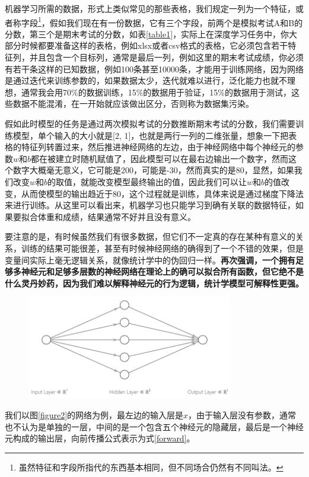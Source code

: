 \documentclass[a5paper, 11pt, openany]{book}
\begin{document}
机器学习所需的数据，形式上类似常见的那些表格，我们规定一列为一个特征，或者称字段\footnote{虽然特征和字段所指代的东西基本相同，但不同场合仍然有不同叫法。}，假如我们现在有一份数据，它有三个字段，前两个是模拟考试A和B的分数，第三个是期末考试的分数，如表\ref{table1}，实际上在深度学习任务中，你大部分时候都要准备这样的表格，例如xlsx或者csv格式的表格，它必须包含若干特征列，并且包含一个目标列，通常是最后一列，例如这里的期末考试成绩，你必须有若干条这样的已知数据，例如100条甚至10000条，才能用于训练网络，因为网络是通过迭代来训练参数的，如果数据太少，迭代就难以进行，泛化能力也就不理想，通常我会用70\%的数据训练，15\%的数据用于验证，15\%的数据用于测试，这些数据不能混淆，在一开始就应该做出区分，否则称为数据集污染。

假如此时模型的任务是通过两次模拟考试的分数推断期末考试的分数，我们需要训练模型，单个输入的大小就是[2, 1]，也就是两行一列的二维张量，想象一下把表格的特征列转置过来，然后推进神经网络的左边，由于神经网络中每个神经元的参数$w$和$b$都在被建立时随机赋值了，因此模型可以在最右边输出一个数字，然而这个数字大概毫无意义，它可能是200，可能是-30，然而真实的是80，显然，如果我们改变$w$和$b$的取值，就能改变模型最终输出的值，因此我们可以让$w$和$b$的值改变，从而使模型的输出趋近于80，这个过程就是训练，具体来说是通过梯度下降法来进行训练。从这里可以看出来，机器学习也只能学习到确有关联的数据特征，如果要拟合体重和成绩，结果通常不好并且没有意义。

要注意的是，有时候虽然我们有很多数据，但它们不一定真的存在某种有意义的关系，训练的结果可能很差，甚至有时候神经网络的确得到了一个不错的效果，但是变量间实际上毫无逻辑关系，就像统计学中的伪回归一样。\textbf{再次强调，一个拥有足够多神经元和足够多层数的神经网络在理论上的确可以拟合所有函数，但它绝不是什么灵丹妙药，因为我们难以解释神经元的行为逻辑，统计学模型可解释性更强。}

\begin{figure}[ht]
    \centering
    \includegraphics[width=0.8\textwidth]{figures/神经网络.png}
\end{figure}

我们以图\ref{figure2}的网络为例，最左边的输入层是$x$，由于输入层没有参数，通常也不认为是单独的一层，中间的是一个包含五个神经元的隐藏层，最后是一个神经元构成的输出层，向前传播公式表示为式\ref{forward}。
\end{document}
